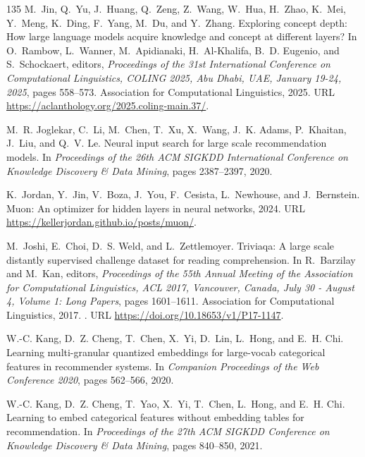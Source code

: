 \begin{thebibliography}{135}
M.~Jin, Q.~Yu, J.~Huang, Q.~Zeng, Z.~Wang, W.~Hua, H.~Zhao, K.~Mei, Y.~Meng,
  K.~Ding, F.~Yang, M.~Du, and Y.~Zhang.
\newblock Exploring concept depth: How large language models acquire knowledge
  and concept at different layers?
\newblock In O.~Rambow, L.~Wanner, M.~Apidianaki, H.~Al{-}Khalifa, B.~D.
  Eugenio, and S.~Schockaert, editors, \emph{Proceedings of the 31st
  International Conference on Computational Linguistics, {COLING} 2025, Abu
  Dhabi, UAE, January 19-24, 2025}, pages 558--573. Association for
  Computational Linguistics, 2025.
\newblock URL \url{https://aclanthology.org/2025.coling-main.37/}.

M.~R. Joglekar, C.~Li, M.~Chen, T.~Xu, X.~Wang, J.~K. Adams, P.~Khaitan,
  J.~Liu, and Q.~V. Le.
\newblock Neural input search for large scale recommendation models.
\newblock In \emph{Proceedings of the 26th ACM SIGKDD International Conference
  on Knowledge Discovery \& Data Mining}, pages 2387--2397, 2020.

K.~Jordan, Y.~Jin, V.~Boza, J.~You, F.~Cesista, L.~Newhouse, and J.~Bernstein.
\newblock Muon: An optimizer for hidden layers in neural networks, 2024.
\newblock URL \url{https://kellerjordan.github.io/posts/muon/}.

M.~Joshi, E.~Choi, D.~S. Weld, and L.~Zettlemoyer.
\newblock Triviaqa: {A} large scale distantly supervised challenge dataset for
  reading comprehension.
\newblock In R.~Barzilay and M.~Kan, editors, \emph{Proceedings of the 55th
  Annual Meeting of the Association for Computational Linguistics, {ACL} 2017,
  Vancouver, Canada, July 30 - August 4, Volume 1: Long Papers}, pages
  1601--1611. Association for Computational Linguistics, 2017.
\newblock {}.
\newblock URL \url{https://doi.org/10.18653/v1/P17-1147}.

W.-C. Kang, D.~Z. Cheng, T.~Chen, X.~Yi, D.~Lin, L.~Hong, and E.~H. Chi.
\newblock Learning multi-granular quantized embeddings for large-vocab
  categorical features in recommender systems.
\newblock In \emph{Companion Proceedings of the Web Conference 2020}, pages
  562--566, 2020.

W.-C. Kang, D.~Z. Cheng, T.~Yao, X.~Yi, T.~Chen, L.~Hong, and E.~H. Chi.
\newblock Learning to embed categorical features without embedding tables for
  recommendation.
\newblock In \emph{Proceedings of the 27th ACM SIGKDD Conference on Knowledge
  Discovery \& Data Mining}, pages 840--850, 2021.


\end{thebibliography}
